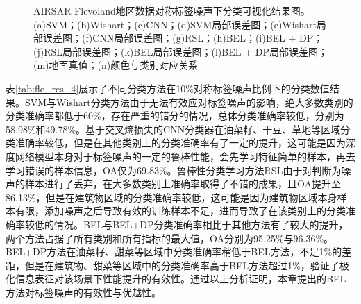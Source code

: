 \begin{figure}[ht!]

    \caption{AIRSAR Flevoland地区数据对称标签噪声下分类可视化结果图。(a)SVM；(b)Wishart；(c)CNN；(d)SVM局部误差图；(e)Wishart局部误差图；(f)CNN局部误差图；(g)RSL；(h)BEL；(i)BEL + DP；(j)RSL局部误差图；(k)BEL局部误差图；(l)BEL + DP局部误差图；(m)地面真值；(n)颜色与类别对应关系}
    \label{fig:fle_res_4}
\end{figure}

表\ref{tab:fle_res_4}展示了不同分类方法在10\%对称标签噪声比例下的分类数值结果。SVM与Wishart分类方法由于无法有效应对标签噪声的影响，绝大多数类别的分类准确率都低于60\%，存在严重的错分的情况，总体分类准确率较低，分别为58.98\%和49.78\%。基于交叉熵损失的CNN分类器在油菜籽、干豆、草地等区域分类准确率较低，但是在其他类别上的分类准确率有了一定的提升，这可能是因为深度网络模型本身对于标签噪声的一定的鲁棒性能，会先学习特征简单的样本，再去学习错误的样本信息，OA仅为69.83\%。鲁棒性分类学习方法RSL由于对判断为噪声的样本进行了丢弃，在大多数类别上准确率取得了不错的成果，且OA提升至86.13\%，但是在建筑物区域的分类准确率较低，这可能是因为建筑物区域本身样本有限，添加噪声之后导致有效的训练样本不足，进而导致了在该类别上的分类准确率较低的情况。BEL与BEL+DP分类准确率相比于其他方法有了较大的提升，两个方法占据了所有类别和所有指标的最大值，OA分别为95.25\%与96.36\%。BEL+DP方法在油菜籽、甜菜等区域中分类准确率稍低于BEL方法，不足1\%的差距，但是在建筑物、甜菜等区域中的分类准确率高于BEL方法超过1\%，验证了极化信息表征对该场景下性能提升的有效性。通过以上分析证明，本章提出的BEL方法对标签噪声的有效性与优越性。

